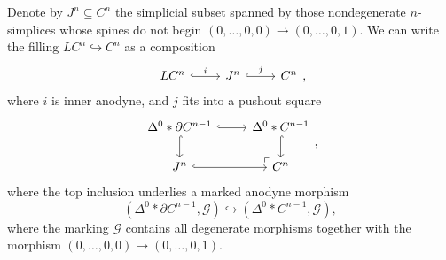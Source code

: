 \documentclass[main.tex]{subfiles}
\begin{document}
\begin{proposition}
  \label{prop:cube_filling}
  Denote by $J^{n} \subseteq C^{n}$ the simplicial subset spanned by those nondegenerate $n$-simplices whose spines do not begin $(0, \ldots, 0, 0) \to (0, \ldots, 0, 1)$. We can write the filling $LC^{n} \hookrightarrow C^{n}$ as a composition
  \begin{equation*}
    \begin{tikzcd}
      LC^{n}
      \arrow[r, hook, "i"]
      & J^{n}
      \arrow[r, hook, "j"]
      & C^{n}
    \end{tikzcd},
  \end{equation*}
  where $i$ is inner anodyne, and $j$ fits into a pushout square
  \begin{equation*}
    \begin{tikzcd}
      \Delta^{0} \ast \partial C^{n-1}
      \arrow[dr, phantom, "\ulcorner"{at end}]
      \arrow[r, hook]
      \arrow[d, hook]
      & \Delta^{0} \ast C^{n-1}
      \arrow[d, hook]
      \\
      J^{n}
      \arrow[r, hook]
      & C^{n}
    \end{tikzcd},
  \end{equation*}
  where the top inclusion underlies a marked anodyne morphism
  \begin{equation*}
    (\Delta^{0} \ast \partial C^{n-1}, \mathcal{G}) \hookrightarrow (\Delta^{0} \ast C^{n-1}, \mathcal{G}),
  \end{equation*}
  where the marking $\mathcal{G}$ contains all degenerate morphisms together with the morphism $(0, \ldots, 0, 0) \to (0, \ldots,0, 1)$.

\end{proposition}
\end{document}
